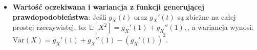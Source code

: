 \documentclass{article}
\theoremstyle{definition}
\theoremstyle{remark}
\begin{document}
\begin{multicols}{2}
\begin{itemize}
    \item \textbf{Wartość oczekiwana i wariancja z funkcji generującej prawdopodobieństwa}: 
    Jeśli \( g_X(t) \) oraz \( g_X'(t) \) są zbieżne na całej prostej rzeczywistej, to:
    \(
    \mathbb{E}[X^2] = g_X'(1) + g_X''(1),
    \), a wariancja wynosi:
    \(
    \text{Var}(X) = g_X'(1) + g_X''(1) - (g_X'(1))^2.
    \)
    
    \end{itemize}




\end{multicols}
\end{document}
